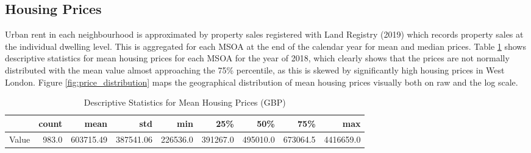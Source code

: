 \documentclass{article}
\begin{document}
\subsection{Housing Prices}
Urban rent in each neighbourhood is approximated by property sales registered with Land Registry (2019) which records property sales at the individual dwelling level. This is aggregated for each MSOA at the end of the calendar year for mean and median prices. Table \ref{table:housing} shows descriptive statistics for mean housing prices for each MSOA for the year of 2018, which clearly shows that the prices are not normally distributed with the mean value almost approaching the 75\% percentile, as this is skewed by significantly high housing prices in West London. Figure \ref{fig:price_distribution} maps the geographical distribution of mean housing prices visually both on raw and the log scale.

\begin{table}[H]
\caption{Descriptive Statistics for Mean Housing Prices (GBP)} 
  \label{table:housing} 
\begin{tabular}{lrrrrrrrr}
\toprule
{} &  count &       mean &        std &       min &       25\% &       50\% &       75\% &        max \\
\midrule
Value &  983.0 &  603715.49 &  387541.06 &  226536.0 &  391267.0 &  495010.0 &  673064.5 &  4416659.0 \\
\bottomrule
\end{tabular}
\end{table}
\end{document}
